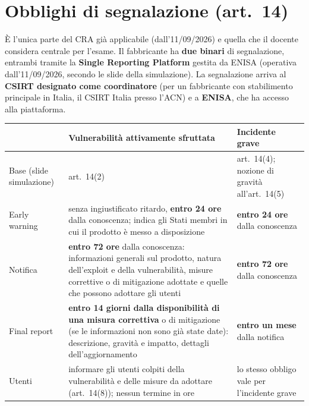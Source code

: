 \section{Obblighi di segnalazione (art.~14)}
\label{sec:cra-segnalazione}

È l'unica parte del CRA già applicabile (dall'11/09/2026) e quella che il docente considera centrale per
l'esame. Il fabbricante ha \textbf{due binari} di segnalazione, entrambi tramite la \textbf{Single
Reporting Platform} gestita da ENISA (operativa dall'11/09/2026, secondo le slide della simulazione).
La segnalazione arriva al \textbf{CSIRT designato come coordinatore} (per un fabbricante con stabilimento
principale in Italia, il CSIRT Italia presso l'ACN) e a \textbf{ENISA}, che ha accesso alla piattaforma.

\begin{center}
\small
\begin{tabularx}{\linewidth}{>{\raggedright\arraybackslash}p{2.6cm} X X}
\toprule
 & \textbf{Vulnerabilità attivamente sfruttata} & \textbf{Incidente grave}\\
\midrule
Base (slide simulazione) & art.~14(2) & art.~14(4); nozione di gravità all'art.~14(5)\\
Early warning & senza ingiustificato ritardo, \textbf{entro 24 ore} dalla conoscenza; indica gli Stati
  membri in cui il prodotto è messo a disposizione & \textbf{entro 24 ore} dalla conoscenza\\
Notifica & \textbf{entro 72 ore} dalla conoscenza: informazioni generali sul prodotto, natura dell'exploit
  e della vulnerabilità, misure correttive o di mitigazione adottate e quelle che possono adottare gli
  utenti & \textbf{entro 72 ore} dalla conoscenza\\
Final report & \textbf{entro 14 giorni dalla disponibilità di una misura correttiva} o di mitigazione
  (se le informazioni non sono già state date): descrizione, gravità e impatto, dettagli
  dell'aggiornamento & \textbf{entro un mese} dalla notifica\\
Utenti & informare gli utenti colpiti della vulnerabilità e delle misure da adottare (art.~14(8));
  nessun termine in ore & lo stesso obbligo vale per l'incidente grave\\
\bottomrule
\end{tabularx}
\end{center}

